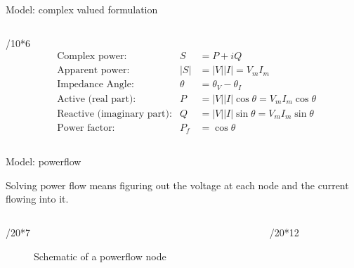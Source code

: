 \documentclass[final]{beamer}
\newlength{\colwidth}
\begin{document}
\begin{frame}[t]
\begin{columns}[t]
\begin{column}{\colwidth}
\begin{alertblock}{Model: complex valued formulation}
\begin{columns}[t]
\begin{column}{\colwidth/10*6}
        \begin{equation}
          \begin{aligned}
              &\text{Complex power:}    &S       &= P + i Q\\
              &\text{Apparent power:}   &|S|     &= |V||I| = V_m I_m\\
              &\text{Impedance Angle:}  &\theta  &= \theta_V-\theta_I \\
              &\text{Active (real part):}     &P       &= |V||I| \cos{\theta} = V_m I_m\cos{\theta} \\
              &\text{Reactive (imaginary part):}   &Q       &= |V||I| \sin{\theta} = V_m I_m\sin{\theta}\\
              &\text{Power factor:}     &P_f     &= \cos{\theta}
          \end{aligned}
          \label{eq:complex_power}
        \end{equation}
      \end{column}

    \end{columns}
  \end{alertblock}

  \begin{block}{Model: powerflow}
    

    Solving power flow means figuring out the voltage at each node and the
    current flowing into it.

    \begin{columns}[t]
      
    \begin{column}{\colwidth/20*7}

      \begin{figure}
        \centering
        
        \caption{Schematic of a powerflow node\autocite{power_system_analysis}}
      \end{figure}

    \end{column}

    \begin{column}{\colwidth/20*12}


\end{column}
\end{columns}
\end{block}
\end{column}
\end{columns}
\end{frame}
\end{document}
